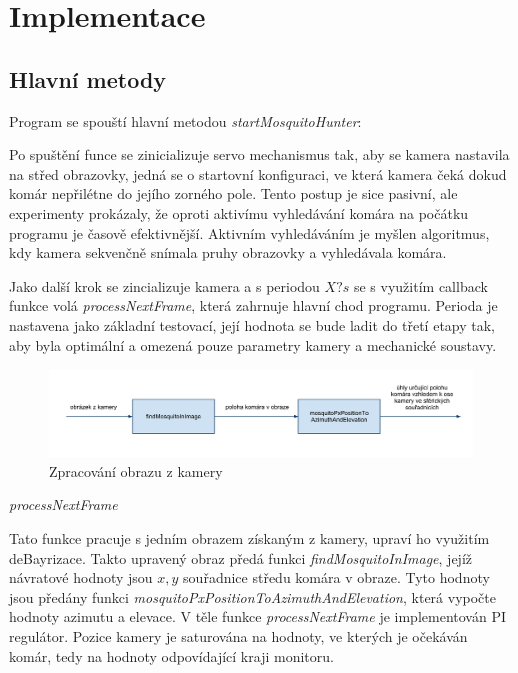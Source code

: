 \documentclass[a4paper,10pt]{article}
\begin{document}
\section{Implementace}

\subsection{Hlavní metody}

Program se spouští hlavní metodou \textit{startMosquitoHunter}:

Po spuštění funce se zinicializuje servo mechanismus tak, aby se kamera nastavila na střed obrazovky, jedná se o startovní konfiguraci, ve která kamera čeká dokud komár nepřilétne do jejího zorného pole. Tento postup je sice pasivní, ale experimenty prokázaly, že oproti aktivímu vyhledávání komára na počátku programu je časově efektivnější. Aktivním vyhledáváním je myšlen algoritmus, kdy kamera sekvenčně snímala pruhy obrazovky a vyhledávala komára.

Jako další krok se zincializuje kamera a s periodou $X? s$ se s využitím callback funkce volá \textit{processNextFrame}, která zahrnuje hlavní chod programu. Perioda je nastavena jako základní testovací, její hodnota se bude ladit do třetí etapy tak, aby byla optimální a omezená pouze parametry kamery a mechanické soustavy. 

\begin{figure}[!h]
    \centering
     \includegraphics[width=1\columnwidth]{pics/zpracovani_obrazu_z_kamery}
     \caption{Zpracování obrazu z kamery\label{fig:rid_system}}
\end{figure}


\vspace{0.5cm}
\textit{processNextFrame}

Tato funkce pracuje s jedním obrazem získaným z kamery, upraví ho využitím deBayrizace. Takto upravený obraz předá funkci \textit{findMosquitoInImage}, jejíž návratové hodnoty jsou $x, y$ souřadnice středu komára v obraze. Tyto hodnoty jsou předány funkci \textit{mosquitoPxPositionToAzimuthAndElevation}, která vypočte hodnoty azimutu a elevace. V těle funkce \textit{processNextFrame} je implementován PI regulátor. Pozice kamery je saturována na hodnoty, ve kterých je očekáván komár, tedy na hodnoty odpovídající kraji monitoru. 
\end{document}
